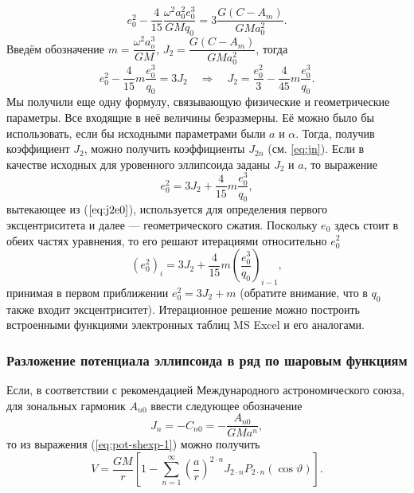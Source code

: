 \documentclass[11pt, a4paper,addpoints]{exam}
\theoremstyle{remark}
\renewcommand{\theta}{\vartheta}
\begin{document}
\begin{equation*}
    e_0^2 - \dfrac{4}{15}\dfrac{\omega^2 a_0^2 e_0^3}{GM q_0} = 3\dfrac{G\left( C - A_m
    \right)}{GM a_0^2}.
\end{equation*}
Введём обозначение $m = \dfrac{\omega^2 a_o^3}{GM}$, $J_2 = \dfrac{G\left( C - A_m
\right)}{GM a_0^2}$, тогда
\begin{equation}
    e_0^2 - \dfrac{4}{15}m\dfrac{e_0^3}{q_0} = 3J_2\quad\Longrightarrow\quad
    J_2 = \dfrac{e_0^2}{3} - \dfrac{4}{45}m\dfrac{e_0^3}{q_0}.
    \label{eq:j2e0}
\end{equation}
Мы получили еще одну формулу, связывающую физические и геометрические параметры. Все входящие
в неё величины безразмерны. Её можно было бы использовать, если бы исходными параметрами были
$a$ и $\alpha$. Тогда, получив коэффициент $J_2$, можно получить коэффициенты $J_{2n}$
(см. \ref{eq:jn}).
Если в качестве исходных для уровенного эллипсоида заданы $J_2$ и $a$, то выражение
\begin{equation}
    e_0^2 = 3J_2  + \dfrac{4}{15}m\dfrac{e_0^3}{q_0},
    \label{eq:j2e0-2}
\end{equation}
вытекающее из ($\ref{eq:j2e0}$), используется для определения первого эксцентриситета и далее ---
геометрического сжатия. Поскольку $e_0$ здесь стоит в обеих частях уравнения, то его решают
итерациями относительно $e_0^2$
\begin{equation}
    \left( e_0^2 \right)_{i} = 3J_2  + \dfrac{4}{15}m\left( \dfrac{e_0^3}{q_0} \right)_{i-1},
    \label{eq:j2e0-3}
\end{equation}
принимая в первом приближении $e_0^2 = 3J_2 + m$ (обратите внимание, что в $q_0$ также
входит эксцентриситет). Итерационное решение можно построить встроенными 
функциями электронных таблиц MS Excel и его аналогами.

\subsubsection*{Разложение потенциала эллипсоида в ряд по шаровым функциям}
Если, в соответствии с рекомендацией Международного астрономического союза, для зональных гармоник
$A_{n0}$ ввести следующее обозначение 
\begin{equation*}
    J_n = -C_{n0} = -\dfrac{A_{n0}}{GMa^n},
\end{equation*}
то из выражения (\ref{eq:pot-shexp-1}) можно получить
\begin{equation}
    V  = \dfrac{GM}{r}   
        \left[ 1 - \sum\limits_{n=1}^{\infty} \left( \dfrac{a}{r} \right)^{2\cdot n}
        J_{2\cdot n} P_{2\cdot n} \left( \cos\theta \right) \right].
        \label{eq:pot-shexp-2c}
\end{equation}
\end{document}
